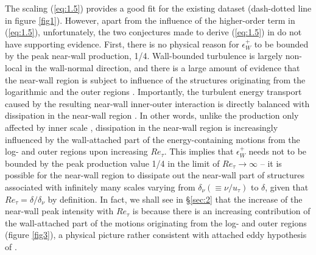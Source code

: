 \documentclass{jfm}
\begin{document}
The scaling (\ref{eq:1.5}) provides a good fit for the existing dataset (dash-dotted line in figure \ref{fig1}). However, apart from the influence of the higher-order term in (\ref{eq:1.5}), unfortunately, the two conjectures made to derive (\ref{eq:1.5}) in \cite{Chen2021} do not have supporting evidence. First, there is no physical reason for $\epsilon_W^+$ to be bounded by the peak near-wall production, 1/4. Wall-bounded turbulence is largely non-local in the wall-normal direction, and there is a large amount of evidence that the near-wall region is subject to influence of the structures originating from the logarithmic and the outer regions \cite[see][and many others]{Hutchins2007,Mathis2009,Mathis2013,Duvvuri2015,Agostini2016,Zhang2016}. Importantly, the turbulent energy transport caused by the resulting near-wall inner-outer interaction is directly balanced with dissipation in the near-wall region \cite[]{Cho2018}. In other words, unlike the production only affected by inner scale \cite[see the Reynolds shear stress spectra (figure 10$e$) in][]{Hwang2016c}, dissipation in the near-wall region is increasingly influenced by the wall-attached part of the energy-containing motions from the log- and outer regions upon increasing $Re_\tau$. This implies that $\epsilon_W^+$ needs not to be bounded by the peak production value 1/4 in the limit of $Re_\tau\rightarrow \infty$ -- it is possible for the near-wall region to dissipate out the near-wall part of structures associated with infinitely many scales varying from $\delta_\nu(\equiv \nu/u_\tau)$ to $\delta$, given that $Re_\tau =\delta/\delta_{\nu}$ by definition. In fact, we shall see in \S\ref{sec:2} that the increase of the near-wall peak intensity with $Re_\tau$ is because there is an increasing contribution of the wall-attached part of the motions originating from the log- and outer regions (figure \ref{fig3}), a physical picture rather consistent with attached eddy hypothesis of \cite{Townsend1976}. %
\end{document}
